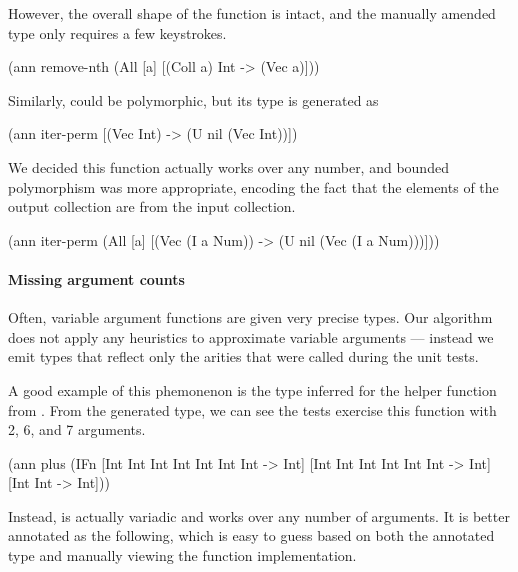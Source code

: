 However, the overall shape of the function is intact,
and the manually amended type only requires a few 
keystrokes.

\begin{cljlisting}
(ann remove-nth
  (All [a] [(Coll a) Int -> (Vec a)]))
\end{cljlisting}

Similarly,  could be polymorphic, 
but its type is generated as

\begin{cljlisting}
(ann iter-perm [(Vec Int) -> (U nil (Vec Int))])
\end{cljlisting}

We decided this function actually works over any number,
and bounded polymorphism was more appropriate, encoding
the fact that the elements of the output collection
are from the input collection.

\begin{cljlisting}
(ann iter-perm
  (All [a]
    [(Vec (I a Num)) -> (U nil (Vec (I a Num)))]))
\end{cljlisting}
%

\paragraph{Missing argument counts}
Often, variable argument functions are given very precise types.
Our algorithm does not apply any heuristics to approximate
variable arguments --- instead we emit types that reflect
only the arities that were called during the unit tests.

A good example of this phemonenon is the type inferred
for the  helper function from .
From the generated type, we can see the tests exercise this function with 2, 6,
and 7 arguments.

\begin{cljlisting}
(ann plus
  (IFn [Int Int Int Int Int Int Int -> Int]
       [Int Int Int Int Int Int -> Int]
       [Int Int -> Int]))
\end{cljlisting}

Instead,  is actually variadic and works over any number of arguments.
It is better annotated as the following, which is easy to guess based on
both the annotated type and manually viewing the function implementation.

